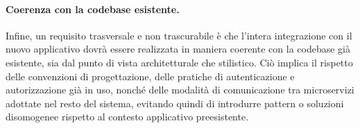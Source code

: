 \paragraph{Coerenza con la codebase esistente.}
Infine, un requisito trasversale e non trascurabile è che l'intera integrazione con il nuovo applicativo dovrà essere realizzata in maniera coerente con la codebase già esistente, sia dal punto di vista architetturale che stilistico. Ciò implica il rispetto delle convenzioni di progettazione, delle pratiche di autenticazione e autorizzazione già in uso, nonché delle modalità di comunicazione tra microservizi adottate nel resto del sistema, evitando quindi di introdurre pattern o soluzioni disomogenee rispetto al contesto applicativo preesistente.